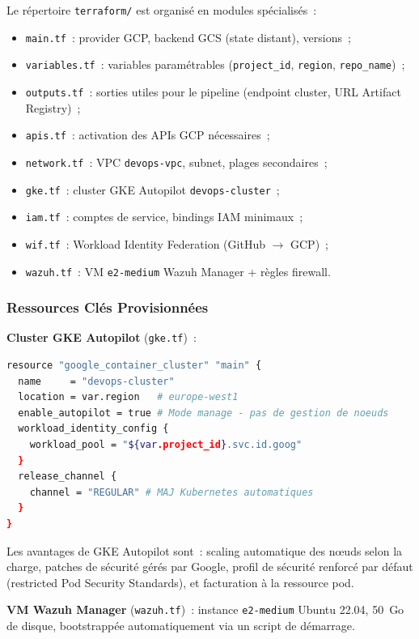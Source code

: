 Le répertoire \texttt{terraform/} est organisé en modules spécialisés~:
\begin{itemize}
  \item \texttt{main.tf}~: provider GCP, backend GCS (state distant), versions~;
  \item \texttt{variables.tf}~: variables paramétrables (\texttt{project\_id}, \texttt{region},
        \texttt{repo\_name})~;
  \item \texttt{outputs.tf}~: sorties utiles pour le pipeline (endpoint cluster, URL Artifact
        Registry)~;
  \item \texttt{apis.tf}~: activation des APIs GCP nécessaires~;
  \item \texttt{network.tf}~: VPC \texttt{devops-vpc}, subnet, plages secondaires~;
  \item \texttt{gke.tf}~: cluster GKE Autopilot \texttt{devops-cluster}~;
  \item \texttt{iam.tf}~: comptes de service, bindings IAM minimaux~;
  \item \texttt{wif.tf}~: Workload Identity Federation (GitHub $\to$ GCP)~;
  \item \texttt{wazuh.tf}~: VM \texttt{e2-medium} Wazuh Manager + règles firewall.
\end{itemize}

\subsubsection{Ressources Clés Provisionnées}

\textbf{Cluster GKE Autopilot} (\texttt{gke.tf})~:

\begin{lstlisting}[language=bash, caption=Configuration Terraform du cluster GKE Autopilot]
resource "google_container_cluster" "main" {
  name     = "devops-cluster"
  location = var.region   # europe-west1
  enable_autopilot = true # Mode manage - pas de gestion de noeuds
  workload_identity_config {
    workload_pool = "${var.project_id}.svc.id.goog"
  }
  release_channel {
    channel = "REGULAR" # MAJ Kubernetes automatiques
  }
}
\end{lstlisting}

Les avantages de GKE Autopilot sont~: scaling automatique des nœuds selon la charge,
patches de sécurité gérés par Google, profil de sécurité renforcé par défaut
(restricted Pod Security Standards), et facturation à la ressource pod.

\textbf{VM Wazuh Manager} (\texttt{wazuh.tf})~: instance \texttt{e2-medium} Ubuntu 22.04,
50~Go de disque, bootstrappée automatiquement via un script de démarrage.


